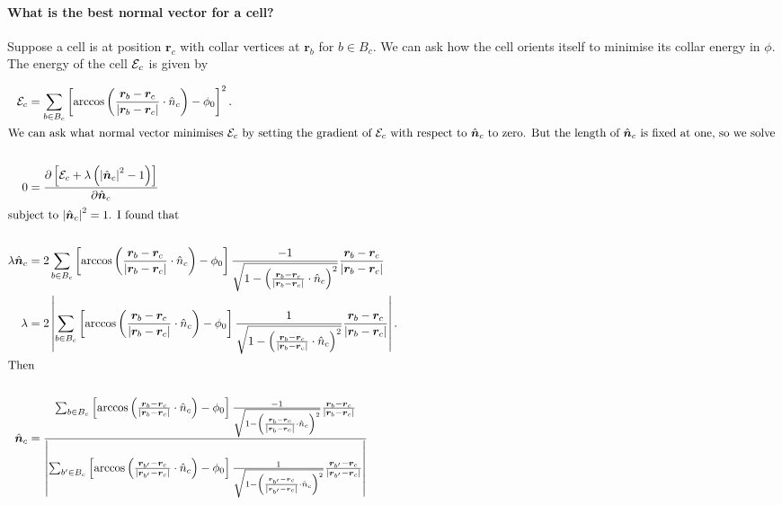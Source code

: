 \paragraph{What is the best normal vector for a cell?}

Suppose a cell is at position $\bm{r}_c$ with collar vertices at $\bm{r}_b$ for $b \in B_c$. We can ask how the cell orients itself to minimise its collar energy in $\phi$. The energy of the cell $\mathcal{E}_c$ is given by 

\begin{align*}
    \mathcal{E}_c &= \sum_{b\in B_c} \left[ \arccos\left(\frac{\bm{r}_b - \bm{r}_c}{\left|\bm{r}_b - \bm{r}_c\right|} \cdot \hat{n}_c \right) - \phi_0 \right]^2. \\
    \intertext{We can ask what normal vector minimises $\mathcal{E}_c$ by setting the gradient of $\mathcal{E}_c$ with respect to $\hat{\bm{n}}_c$ to zero. But the length of $\hat{\bm{n}}_c$ is fixed at one, so we solve } \\
    0 &= \frac{\partial \left[ \mathcal{E}_c + \lambda\left( \left| \hat{\bm{n}}_c\right|^2 - 1\right) \right] }{\partial \hat{\bm{n}}_c} \\
    \intertext{subject to $\left| \hat{\bm{n}}_c\right|^2 = 1$. I found that } \\
    \lambda \hat{\bm{n}}_c &= 2 \sum_{b \in B_c} \left[ \arccos\left(\frac{\bm{r}_b - \bm{r}_c}{\left|\bm{r}_b - \bm{r}_c\right|} \cdot \hat{n}_c \right) - \phi_0 \right] \frac{-1}{\sqrt{1 - \left(\frac{\bm{r}_b - \bm{r}_c}{\left|\bm{r}_b - \bm{r}_c\right|} \cdot \hat{n}_c \right)^2 }}\frac{\bm{r}_b - \bm{r}_c}{\left|\bm{r}_b - \bm{r}_c\right|}
    \\
    \lambda &= 2 \left| \sum_{b\in B_c} \left[\arccos\left(\frac{\bm{r}_b - \bm{r}_c}{\left|\bm{r}_b - \bm{r}_c\right|} \cdot \hat{n}_c \right) - \phi_0 \right]
    \frac{1}{\sqrt{1 - \left(\frac{\bm{r}_b - \bm{r}_c}{\left|\bm{r}_b - \bm{r}_c\right|} \cdot \hat{n}_c \right)^2 }}
    \frac{\bm{r}_b - \bm{r}_c}{\left|\bm{r}_b - \bm{r}_c\right|} \right|. \\
    \intertext{Then } \\
    \hat{\bm{n}}_c &= \frac{\sum_{b \in B_c} \left[ \arccos\left(\frac{\bm{r}_b - \bm{r}_c}{\left|\bm{r}_b - \bm{r}_c\right|} \cdot \hat{n}_c \right) - \phi_0 \right] \frac{-1}{\sqrt{1 - \left(\frac{\bm{r}_b - \bm{r}_c}{\left|\bm{r}_b - \bm{r}_c\right|} \cdot \hat{n}_c \right)^2 }}\frac{\bm{r}_b - \bm{r}_c}{\left|\bm{r}_b - \bm{r}_c\right|}}{\left| \sum_{b'\in B_c} \left[\arccos\left(\frac{\bm{r}_{b'} - \bm{r}_c}{\left|\bm{r}_{b'} - \bm{r}_c\right|} \cdot \hat{n}_c \right) - \phi_0 \right]
    \frac{1}{\sqrt{1 - \left(\frac{\bm{r}_{b'} - \bm{r}_c}{\left|\bm{r}_{b'} - \bm{r}_c\right|} \cdot \hat{n}_c \right)^2 }}
    \frac{\bm{r}_{b'} - \bm{r}_c}{\left|\bm{r}_{b'} - \bm{r}_c\right|} \right|}
\end{align*}



